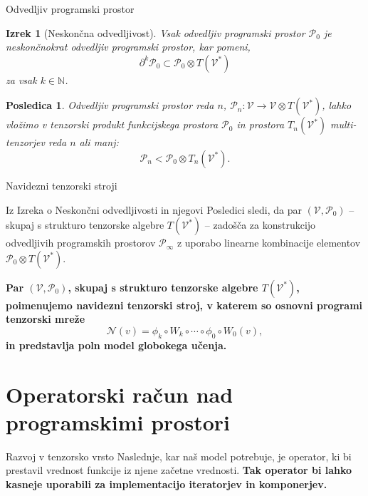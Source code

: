 \documentclass{beamer}
\newcommand{\VV}{\mathcal{V}}
\newcommand{\NN}{\mathcal{N}}
\newcommand{\dP}{\mathcal{P}}
\newcommand{\D}{\partial}
\newtheorem{izrek}{Izrek}[section]
\newtheorem{posledica}{Posledica}[section]
\begin{document}
\begin{frame}{Odvedljiv programski prostor}
\begin{izrek}[Neskončna odvedljivost]\label{thm:infDif}
Vsak odvedljiv programski prostor $\dP_0$ je \emph{neskončnokrat odvedljiv programski prostor}, kar pomeni,
\begin{equation*}\label{eq:P_n}
	 		\D^k\dP_0\subset\dP_0\otimes T(\VV^*)
	 	\end{equation*}
za vsak $k\in\mathbb{N}$.
\end{izrek}

\begin{posledica}\label{tenProdEmb}
Odvedljiv programski prostor reda $n$, $\dP_n:\VV\to\VV\otimes T(\VV^*)$, lahko vložimo v tenzorski produkt funkcijskega prostora $\dP_0$ in prostora $T_n(\VV^*)$ multi-tenzorjev reda $n$ ali manj:
\begin{equation*}
    \label{eq:D_p_embed}
    \dP_n<\dP_0\otimes T_n(\VV^*).
  \end{equation*}
\end{posledica}

\end{frame}

\begin{frame}{Navidezni tenzorski stroji}

Iz Izreka o Neskončni odvedljivosti in njegovi Posledici sledi, da par $(\VV, \dP_0)$ -- skupaj s strukturo tenzorske algebre $T(\VV^*)$ -- zadošča za konstrukcijo odvedljivih programskih prostorov $\dP_\infty$ z uporabo linearne kombinacije elementov $\dP_0\otimes T(\VV^*)$. 

\textbf{Par $(\VV, \dP_0)$, skupaj s strukturo tenzorske algebre $T(\VV^*)$, poimenujemo navidezni tenzorski stroj, v katerem so osnovni programi tenzorski mreže}
\begin{equation*} \label{eq:tenWord}
\NN(v)=\phi_k\circ W_k\circ\cdots\circ\phi_0\circ W_0(v),
\end{equation*}
\textbf{in predstavlja poln model globokega učenja.}
\end{frame}

\section{Operatorski račun nad programskimi prostori}

\begin{frame}{Razvoj v tenzorsko vrsto}
Naslednje, kar naš model potrebuje, je operator, ki bi prestavil vrednost
funkcije iz njene začetne vrednosti. \textbf{Tak operator bi lahko kasneje uporabili
za implementacijo iteratorjev in komponerjev.}
\end{frame}
\end{document}
